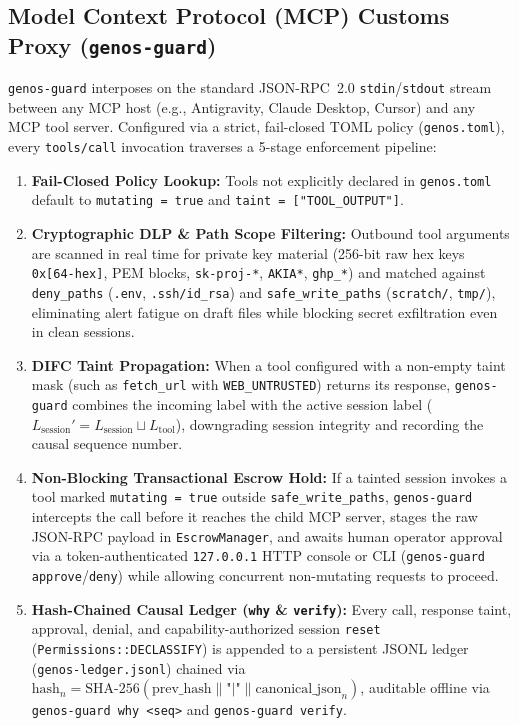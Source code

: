 \documentclass[10pt,journal,compsoc]{IEEEtran}
\theoremstyle{definition}
\begin{document}
\subsection{Model Context Protocol (MCP) Customs Proxy (\texttt{genos-guard})}
\texttt{genos-guard} interposes on the standard JSON-RPC~2.0 \texttt{stdin}/\texttt{stdout} stream between any MCP host (e.g., Antigravity, Claude Desktop, Cursor) and any MCP tool server. Configured via a strict, fail-closed TOML policy (\texttt{genos.toml}), every \texttt{tools/call} invocation traverses a 5-stage enforcement pipeline:
\begin{enumerate}
    \item \textbf{Fail-Closed Policy Lookup:} Tools not explicitly declared in \texttt{genos.toml} default to \texttt{mutating = true} and \texttt{taint = ["TOOL\_OUTPUT"]}.
    \item \textbf{Cryptographic DLP \& Path Scope Filtering:} Outbound tool arguments are scanned in real time for private key material (256-bit raw hex keys \texttt{0x[64-hex]}, PEM blocks, \texttt{sk-proj-*}, \texttt{AKIA*}, \texttt{ghp\_*}) and matched against \texttt{deny\_paths} (\texttt{.env}, \texttt{.ssh/id\_rsa}) and \texttt{safe\_write\_paths} (\texttt{scratch/}, \texttt{tmp/}), eliminating alert fatigue on draft files while blocking secret exfiltration even in clean sessions.
    \item \textbf{DIFC Taint Propagation:} When a tool configured with a non-empty taint mask (such as \texttt{fetch\_url} with \texttt{WEB\_UNTRUSTED}) returns its response, \texttt{genos-guard} combines the incoming label with the active session label ($L_{\text{session}}' = L_{\text{session}} \sqcup L_{\text{tool}}$), downgrading session integrity and recording the causal sequence number.
    \item \textbf{Non-Blocking Transactional Escrow Hold:} If a tainted session invokes a tool marked \texttt{mutating = true} outside \texttt{safe\_write\_paths}, \texttt{genos-guard} intercepts the call before it reaches the child MCP server, stages the raw JSON-RPC payload in \texttt{EscrowManager}, and awaits human operator approval via a token-authenticated \texttt{127.0.0.1} HTTP console or CLI (\texttt{genos-guard approve}/\texttt{deny}) while allowing concurrent non-mutating requests to proceed.
    \item \textbf{Hash-Chained Causal Ledger (\texttt{why} \& \texttt{verify}):} Every call, response taint, approval, denial, and capability-authorized session \texttt{reset} (\texttt{Permissions::\allowbreak DECLASSIFY}) is appended to a persistent JSONL ledger (\texttt{genos-ledger.jsonl}) chained via $\text{hash}_n = \text{SHA-256}(\text{prev\_hash} \parallel \texttt{"|"} \parallel \text{canonical\_json}_n)$, auditable offline via \texttt{genos-guard why <seq>} and \texttt{genos-guard verify}.
\end{enumerate}
\end{document}
